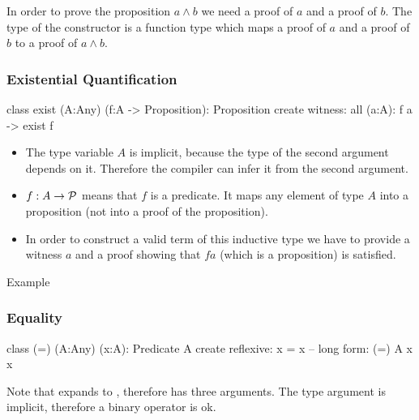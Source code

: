 In order to prove the proposition $a \land b$ we need a proof of $a$ and a
proof of $b$. The type of the constructor is a function type which maps a
proof of $a$ and a proof of $b$ to a proof of $a \land b$.
\newline





\subsubsection{Existential Quantification}

\begin{alba}
  class
    exist (A:Any) (f:A -> Proposition): Proposition
  create
    witness: all (a:A): f a -> exist f
\end{alba}

\begin{itemize}
\item The type variable $A$ is implicit, because the type of the second
  argument depends on it. Therefore the compiler can infer it from the second
  argument.

\item $f:A\to {\cal{P}}$ means that $f$ is a predicate. It maps any element of
  type $A$ into a proposition (not into a proof of the proposition).

\item In order to construct a valid term of this inductive type we have to
  provide a witness $a$ and a proof showing that $f a$ (which is a
  proposition) is satisfied.
\end{itemize}

Example
\vskip 2mm


\subsubsection{Equality}
\label{sec:equality}

\begin{alba}
  class
    (=) (A:Any) (x:A): Predicate A
  create
    reflexive: x = x    -- long form: (=) A x x
\end{alba}

Note that  expands to , therefore
\code{(=)} has three arguments. The type argument is implicit, therefore a
binary operator is ok.
\vskip 2mm


